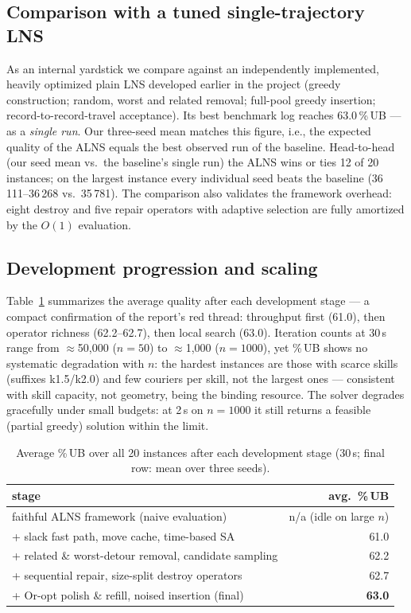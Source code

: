 \documentclass[10pt, a4paper]{article}
\newcommand{\ub}{\%\,UB}
\begin{document}
\subsection{Comparison with a tuned single-trajectory LNS}\label{sec:baseline}
As an internal yardstick we compare against an independently implemented,
heavily optimized plain LNS developed earlier in the project (greedy
construction; random, worst and related removal; full-pool greedy insertion;
record-to-record-travel acceptance). Its best benchmark log reaches
63.0\,\ub{} --- as a \emph{single run}. Our three-seed mean matches this
figure, i.e., the expected quality of the ALNS equals the best observed run
of the baseline. Head-to-head (our seed mean vs.\ the baseline's single run)
the ALNS wins or ties 12 of 20 instances; on the largest instance every
individual seed beats the baseline (36\,111--36\,268 vs.\ 35\,781). The
comparison also validates the framework overhead: eight destroy and five
repair operators with adaptive selection are fully amortized by the $O(1)$
evaluation.

\subsection{Development progression and scaling}
Table~\ref{tab:progress} summarizes the average quality after each
development stage --- a compact confirmation of the report's red thread:
throughput first (61.0), then operator richness (62.2--62.7), then local
search (63.0). Iteration counts at 30\,s range from $\approx$50{,}000
($n{=}50$) to $\approx$1{,}000 ($n{=}1000$), yet \ub{} shows no systematic
degradation with $n$: the hardest instances are those with scarce skills
(suffixes k1.5/k2.0) and few couriers per skill, not the largest ones ---
consistent with skill capacity, not geometry, being the binding resource.
The solver degrades gracefully under small budgets: at 2\,s on $n{=}1000$ it
still returns a feasible (partial greedy) solution within the limit.

\begin{table}[t]
\centering\small
\caption{Average \ub{} over all 20 instances after each development stage
(30\,s; final row: mean over three seeds).}
\label{tab:progress}
\begin{tabular}{lr}
\toprule
stage & avg.\ \ub \\
\midrule
faithful ALNS framework (naive evaluation)              & n/a (idle on large $n$) \\
+ slack fast path, move cache, time-based SA            & 61.0 \\
+ related \& worst-detour removal, candidate sampling   & 62.2 \\
+ sequential repair, size-split destroy operators       & 62.7 \\
+ Or-opt polish \& refill, noised insertion (final)     & \textbf{63.0} \\
\bottomrule
\end{tabular}
\end{table}
\end{document}
